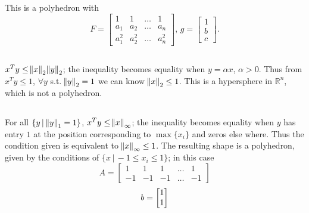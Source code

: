 \documentclass[11pt]{article}
\begin{document}
\maketitle
\section{}
\subsection{}
This is a polyhedron with $$F=\begin{bmatrix} 1 & 1 & \dots &1\\a_1 & a_2 & \dots&a_n\\a_1^2&a_2^2&\dots&a_n^2 \end{bmatrix},\,g=\begin{bmatrix}1\\b\\c \end{bmatrix}.$$
\subsection{}
$x^Ty\leq\norm{x}_2\norm{y}_2$; the inequality becomes equality when $y=\alpha x$, $\alpha > 0$. Thus from $x^Ty\leq 1$, $\forall y$ s.t. $\norm{y}_2=1$ we can know $\norm{x}_2\leq1$. This is a hypersphere in $\mathbb{R}^n$, which is not a polyhedron.
\subsection{}
For all $\{y\, |\,\norm{y}_1=1\}$, $x^Ty\leq\norm{x}_\infty$; the inequality becomes equality when $y$ has entry $1$ at the position corresponding to $\max \{x_i\}$ and zeros else where. Thus the condition given is equivalent to $\norm{x}_\infty\leq1$. The resulting shape is a polyhedron, given by the conditions of $\{x\, |\, -1\leq x_i\leq1\}$; in this case $$A=\begin{bmatrix} 1 & 1 & 1 &\dots&1\\-1 &-1&-1&\dots& -1 \end{bmatrix}$$ $$\\b=\begin{bmatrix}1\\1\end{bmatrix}$$
\end{document}
